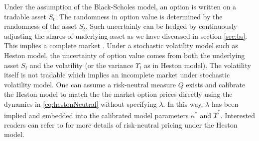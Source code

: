 \documentclass[letterpaper,12pt,titlepage,oneside,final]{book}
\numberwithin{equation}{section}
\theoremstyle{definition}
\begin{document}
Under the assumption of the Black-Scholes model, an option is written on a tradable asset $S_t$. The randomness in option value is determined by the randomness of the asset $S_t$. Such uncertainly can be hedged by continuously adjusting the shares of underlying asset as we have discussed in  section \ref{sec:bs}. This implies a complete market \cite{shreve2004stochastic}.
Under a stochastic volatility model such as Heston model, the uncertainty of option value comes from both the underlying asset $S_t$ and the volatility (or the variance $\Upsilon_t$ as in Heston model). The volatility itself is not tradable which implies an incomplete market under stochastic volatility model. 
One can assume a risk-neutral measure $Q$ exists and calibrate the Heston model to match the the market option prices directly using the dynamics in \eqref{eq:hestonNeutral} without specifying $\lambda$. In this way, $\lambda$ has been implied and embedded into the calibrated model parameters $\kappa^*$ and $\overline{\Upsilon}^*$. Interested readers can refer to \cite{heston1993closed,gatheral2011volatility} for more details of risk-neutral pricing under the Heston model.

\end{document}
